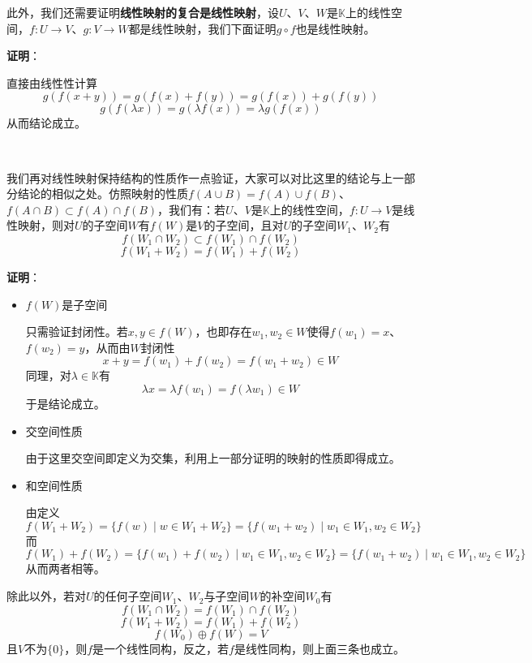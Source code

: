 \documentclass[a4paper,UTF8,fontset=windows,AutoFakeBold]{ctexart}
\newcommand{\proo}[1]{{\vspace{5pt}\kaishu\noindent\textbf{证明}：\vspace{-3pt}
\begin{compactitem}
    \item[] #1
\end{compactitem}
}}
\begin{document}
此外，我们还需要证明\textbf{线性映射的复合是线性映射}，设$U$、$V$、$W$是$\mathbb{K}$上的线性空间，$f:U\to V$、$g:V\to W$都是线性映射，我们下面证明$g\circ f$也是线性映射。

\proo{
    直接由线性性计算
    $$g(f(x+y))=g(f(x)+f(y))=g(f(x))+g(f(y))$$
    $$g(f(\lambda x))=g(\lambda f(x))=\lambda g(f(x))$$
    从而结论成立。
}

\

我们再对线性映射保持结构的性质作一点验证，大家可以对比这里的结论与上一部分结论的相似之处。仿照映射的性质$f(A\cup B)=f(A)\cup f(B)$、$f(A\cap B)\subset f(A)\cap f(B)$，我们有：若$U$、$V$是$\mathbb{K}$上的线性空间，$f:U\to V$是线性映射，则对$U$的子空间$W$有$f(W)$是$V$的子空间，且对$U$的子空间$W_1$、$W_2$有
$$f(W_1\cap W_2)\subset f(W_1)\cap f(W_2)$$
$$f(W_1+W_2)=f(W_1)+f(W_2)$$

\proo{
    \begin{itemize}
        \item $f(W)$是子空间
        
        只需验证封闭性。若$x,y\in f(W)$，也即存在$w_1,w_2\in W$使得$f(w_1)=x$、$f(w_2)=y$，从而由$W$封闭性
        $$x+y=f(w_1)+f(w_2)=f(w_1+w_2)\in W$$
        同理，对$\lambda\in\mathbb{K}$有
        $$\lambda x=\lambda f(w_1)=f(\lambda w_1)\in W$$
        于是结论成立。

        \item 交空间性质
        
        由于这里交空间即定义为交集，利用上一部分证明的映射的性质即得成立。

        \item 和空间性质
        
        由定义
        $$f(W_1+W_2)=\{f(w)\mid w\in W_1+W_2\}=\{f(w_1+w_2)\mid w_1\in W_1,w_2\in W_2\}$$
        而
        $$f(W_1)+f(W_2)=\{f(w_1)+f(w_2)\mid w_1\in W_1,w_2\in W_2\}=\{f(w_1+w_2)\mid w_1\in W_1,w_2\in W_2\}$$
        从而两者相等。
    \end{itemize}
}

除此以外，若对$U$的任何子空间$W_1$、$W_2$与子空间$W$的补空间$W_0$有
$$f(W_1\cap W_2)=f(W_1)\cap f(W_2)$$
$$f(W_1+W_2)=f(W_1)+f(W_2)$$
$$f(W_0)\oplus f(W)=V$$
且$V$不为$\{0\}$，则$f$是一个线性同构，反之，若$f$是线性同构，则上面三条也成立。
\end{document}
